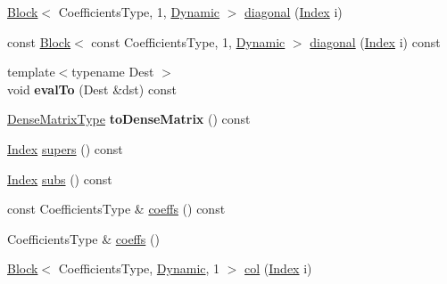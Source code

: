 \begin{DoxyCompactItemize}
\item 
\hyperlink{group___core___module_class_eigen_1_1_block}{Block}$<$ Coefficients\+Type, 1, \hyperlink{namespace_eigen_ad81fa7195215a0ce30017dfac309f0b2}{Dynamic} $>$ \hyperlink{class_eigen_1_1internal_1_1_band_matrix_base_a51ce12f0be57b0c2593c20c865de6af1}{diagonal} (\hyperlink{group___core___module_a554f30542cc2316add4b1ea0a492ff02}{Index} i)
\item 
const \hyperlink{group___core___module_class_eigen_1_1_block}{Block}$<$ const Coefficients\+Type, 1, \hyperlink{namespace_eigen_ad81fa7195215a0ce30017dfac309f0b2}{Dynamic} $>$ \hyperlink{class_eigen_1_1internal_1_1_band_matrix_base_a8f7146e80405018d6d0827c4a7713ad3}{diagonal} (\hyperlink{group___core___module_a554f30542cc2316add4b1ea0a492ff02}{Index} i) const
\item 
\mbox{\label{class_eigen_1_1internal_1_1_band_matrix_base_a48c573fc9b58a2d4dd0741b284124a64}} 
{\footnotesize template$<$typename Dest $>$ }\\void {\bfseries eval\+To} (Dest \&dst) const
\item 
\mbox{\label{class_eigen_1_1internal_1_1_band_matrix_base_aacfa0b85201b8503376a9998987f81f7}} 
\hyperlink{group___core___module_class_eigen_1_1_matrix}{Dense\+Matrix\+Type} {\bfseries to\+Dense\+Matrix} () const
\item 
\hyperlink{group___core___module_a554f30542cc2316add4b1ea0a492ff02}{Index} \hyperlink{class_eigen_1_1internal_1_1_band_matrix_base_a58617da0d75d22b1f8dfdfde702ebb4a}{supers} () const
\item 
\hyperlink{group___core___module_a554f30542cc2316add4b1ea0a492ff02}{Index} \hyperlink{class_eigen_1_1internal_1_1_band_matrix_base_a1115fe9b5a07d5218dacc15655a413cb}{subs} () const
\item 
const Coefficients\+Type \& \hyperlink{class_eigen_1_1internal_1_1_band_matrix_base_ab7c9e9a7ca5ad0f2f3a82ac582650499}{coeffs} () const
\item 
Coefficients\+Type \& \hyperlink{class_eigen_1_1internal_1_1_band_matrix_base_ab296a77fa3ac9c7618957b01c7de0a35}{coeffs} ()
\item 
\hyperlink{group___core___module_class_eigen_1_1_block}{Block}$<$ Coefficients\+Type, \hyperlink{namespace_eigen_ad81fa7195215a0ce30017dfac309f0b2}{Dynamic}, 1 $>$ \hyperlink{class_eigen_1_1internal_1_1_band_matrix_base_aca78a4990b6827b0b3086e28e6ae4257}{col} (\hyperlink{group___core___module_a554f30542cc2316add4b1ea0a492ff02}{Index} i)

\end{DoxyCompactItemize}
